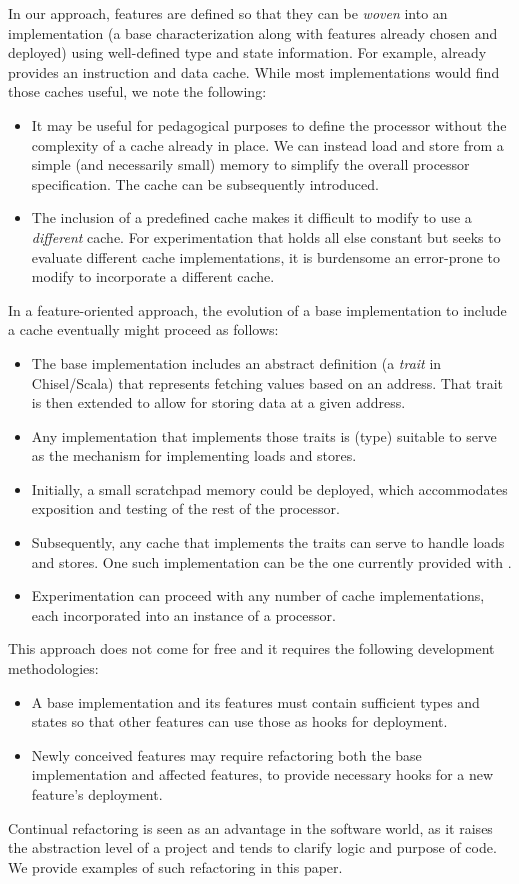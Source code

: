 \documentclass[conference]{IEEEtran}
\begin{document}
In our approach, features are defined so that they can be \emph{woven} into an implementation (a base characterization along with features already chosen and deployed) using well-defined type and state information.  For example, \Riscvmini{} already provides an instruction and data cache.  While most implementations would find those caches useful, we note the following:
\begin{itemize}
    \item It may be useful for pedagogical purposes to define the processor without the complexity of a cache already in place.  We can instead load and store from a simple (and necessarily small) memory to simplify the overall processor specification.  The cache can be subsequently introduced.
    \item The inclusion of a predefined cache makes it difficult to modify \Riscvmini{} to use a \emph{different} cache.  For experimentation that holds all else constant but seeks to evaluate different cache implementations, it is burdensome an error-prone to modify \Riscvmini{} to incorporate a different cache. 
\end{itemize}
In a feature-oriented approach, the evolution of a base implementation to include a cache eventually might proceed as follows:
\begin{itemize}
    \item The base implementation includes an abstract definition (a \emph{trait} in Chisel/Scala) that represents fetching values based on an address.  That trait is then extended to allow for storing data at a given address.  
    \item Any implementation that implements those traits is (type) suitable to serve as the mechanism for implementing loads and stores.
    \item Initially, a small scratchpad memory could be deployed, which accommodates exposition and testing of the rest of the processor.
    \item Subsequently, any cache that implements the traits can serve to handle loads and stores.  One such implementation can be the one currently provided with \Riscvmini{}.
    \item Experimentation can proceed with any number of cache implementations, each incorporated into an instance of a \Riscvmini{} processor.
\end{itemize}
This approach does not come for free and it requires the following development methodologies:
\begin{itemize}
    \item A base implementation and its features must contain sufficient types and states so that other features can use those as hooks for deployment.
    \item Newly conceived features may require refactoring both the base implementation and affected features, to provide necessary hooks for a new feature's deployment.
\end{itemize}
Continual refactoring is seen as an advantage in the software world, as it raises the abstraction level of a project and tends to clarify logic and purpose of code. We provide examples of such refactoring in this paper. 
\end{document}
